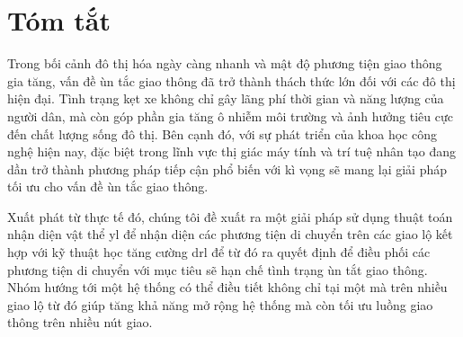 \chapter*{Tóm tắt}
Trong bối cảnh đô thị hóa ngày càng nhanh và mật độ phương tiện giao thông gia tăng, vấn đề ùn tắc giao thông đã trở thành thách thức lớn đối với các đô thị hiện đại. Tình trạng kẹt xe không chỉ gây lãng phí thời gian và năng lượng của người dân, mà còn góp phần gia tăng ô nhiễm môi trường và ảnh hưởng tiêu cực đến chất lượng sống đô thị. Bên cạnh đó, với sự phát triển của khoa học công nghệ hiện nay, đặc biệt trong lĩnh vực thị giác máy tính và trí tuệ nhân tạo đang dần trở thành phương pháp tiếp cận phổ biến với kì vọng sẽ mang lại giải pháp tối ưu cho vấn đề ùn tắc giao thông.

Xuất phát từ thực tế đó, chúng tôi đề xuất ra một giải pháp sử dụng thuật toán nhận diện vật thể \ac{yl} để nhận diện các phương tiện di chuyển trên các giao lộ kết hợp với kỹ thuật học tăng cường \ac{drl} để từ đó ra quyết định để điều phối các phương tiện di chuyển với mục tiêu sẽ hạn chế tình trạng ùn tắt giao thông. Nhóm hướng tới một hệ thống có thể điều tiết không chỉ tại một mà trên nhiều giao lộ từ đó giúp tăng khả năng mở rộng hệ thống mà còn tối ưu luồng giao thông trên nhiều nút giao.